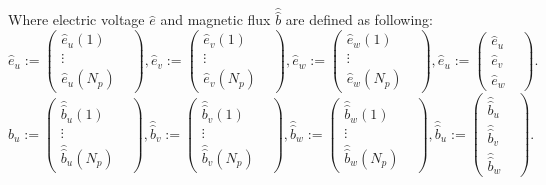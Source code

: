 Where electric voltage $\widehat{e}$ and magnetic flux $\widehat{ \widehat{b}}$ are defined as following:
\begin{equation}
\widehat{e}_{u}:=
\begin{pmatrix}
\widehat{e}_{u}(1)&\\
\vdots&\\
\widehat{e}_{u}(N_{p})&
\end{pmatrix},
\widehat{e}_{v}:=
\begin{pmatrix}
\widehat{e}_{v}(1)&\\
\vdots&\\
\widehat{e}_{v}(N_{p})&
\end{pmatrix},
\widehat{e}_{w}:=
\begin{pmatrix}
\widehat{e}_{w}(1)&\\
\vdots&\\
\widehat{e}_{w}(N_{p})&
\end{pmatrix},
\widehat{e}_{u}:=
\begin{pmatrix}
\widehat{e}_{u}&\\
\widehat{e}_{v}&\\
\widehat{e}_{w}&
\end{pmatrix}.
\label{eq:vector_e_voltage}
\end{equation}
\begin{equation}
\widehat{\widehat{b}}_{u}:=
\begin{pmatrix}
\widehat{\widehat{b}}_{u}(1)&\\
\vdots&\\
\widehat{\widehat{b}}_{u}(N_{p})&
\end{pmatrix},
\widehat{\widehat{b}}_{v}:=
\begin{pmatrix}
\widehat{\widehat{b}}_{v}(1)&\\
\vdots&\\
\widehat{\widehat{b}}_{v}(N_{p})&
\end{pmatrix},
\widehat{\widehat{b}}_{w}:=
\begin{pmatrix}
\widehat{\widehat{b}}_{w}(1)&\\
\vdots&\\
\widehat{\widehat{b}}_{w}(N_{p})&
\end{pmatrix},
\widehat{\widehat{b}}_{u}:=
\begin{pmatrix}
\widehat{\widehat{b}}_{u}&\\
\widehat{\widehat{b}}_{v}&\\
\widehat{\widehat{b}}_{w}&
\end{pmatrix}.
\label{eq:vector_m_flux}
\end{equation}
